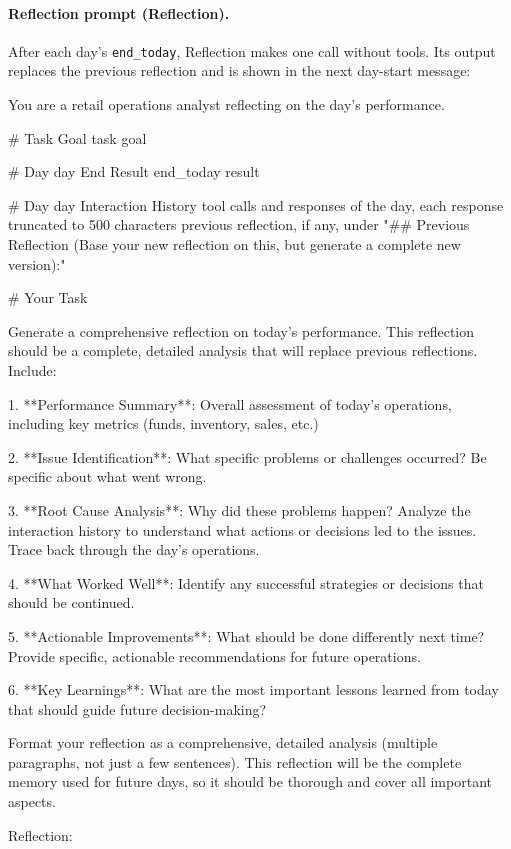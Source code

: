 \paragraph{Reflection prompt (Reflection).}
After each day's \texttt{end\_today}, Reflection makes one call without tools. Its output replaces the previous reflection and is shown in the next day-start message:
\begin{PromptBox}
You are a retail operations analyst reflecting on the day's performance.

# Task Goal
{task goal}

# Day {day} End Result
{end_today result}

# Day {day} Interaction History
{tool calls and responses of the day, each response truncated to 500 characters}
{previous reflection, if any, under "## Previous Reflection (Base your new reflection on this, but generate a complete new version):"}

# Your Task

Generate a comprehensive reflection on today's performance. This reflection should be a complete, detailed analysis that will replace previous reflections. Include:

1. **Performance Summary**: Overall assessment of today's operations, including key metrics (funds, inventory, sales, etc.)

2. **Issue Identification**: What specific problems or challenges occurred? Be specific about what went wrong.

3. **Root Cause Analysis**: Why did these problems happen? Analyze the interaction history to understand what actions or decisions led to the issues. Trace back through the day's operations.

4. **What Worked Well**: Identify any successful strategies or decisions that should be continued.

5. **Actionable Improvements**: What should be done differently next time? Provide specific, actionable recommendations for future operations.

6. **Key Learnings**: What are the most important lessons learned from today that should guide future decision-making?

Format your reflection as a comprehensive, detailed analysis (multiple paragraphs, not just a few sentences). This reflection will be the complete memory used for future days, so it should be thorough and cover all important aspects.

Reflection:
\end{PromptBox}

